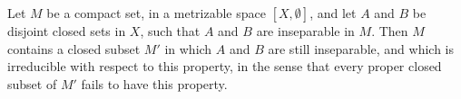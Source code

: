 Let $M$ be a compact set, in a metrizable space $[X, \emptyset]$, and let $A$ and $B$ be disjoint closed sets in $X$, such that $A$ and $B$ are inseparable in $M$. Then $M$ contains a closed subset $M'$ in which $A$ and $B$ are still inseparable, and which is irreducible with respect to this property, in the sense that every proper closed subset of $M'$ fails to have this property.
